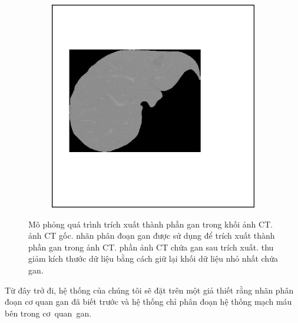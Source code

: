 \begin{figure}[h!]
\begin{subfigure}[b]{0.24\textwidth}
			\caption{}
			\label{fig:pre_processing_extract_crop}
		\end{subfigure}
		\hfill
		\begin{subfigure}[b]{0.24\textwidth}
			\includegraphics[width=\textwidth]{figures/pre_processing_extract_done}
			\caption{}
			\label{fig:pre_processing_extract_done}
		\end{subfigure}
		\caption[Mô phỏng quá trình trích xuất thành phần gan trong khối ảnh CT.]{Mô phỏng quá trình trích xuất thành phần gan trong khối ảnh CT.  ảnh CT gốc.  nhãn phân đoạn gan được sử dụng để trích xuất thành phần gan trong ảnh CT.  phần ảnh CT chứa gan sau trích xuất.  thu giảm kích thước dữ liệu bằng cách giữ lại khối dữ liệu nhỏ nhất chứa gan.}
		\label{fig:pre_processing_extract}
	\end{figure}

	Từ đây trở đi, hệ thống của chúng tôi sẽ đặt trên một giả thiết rằng nhãn phân đoạn cơ quan gan đã biết trước và hệ thống chỉ phân đoạn hệ thống mạch máu bên trong cơ~quan~gan.

\newpage
